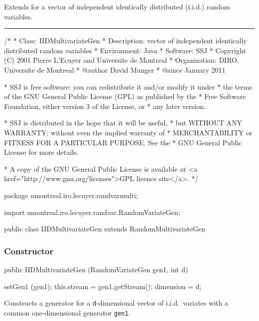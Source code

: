 
Extends  for a vector of independent identically distributed
(i.i.d.) random variables.


\bigskip\hrule

\begin{code}
\begin{hide}
/*
 * Class:        IIDMultivariateGen
 * Description:  vector of independent identically distributed random variables
 * Environment:  Java
 * Software:     SSJ 
 * Copyright (C) 2001  Pierre L'Ecuyer and Universite de Montreal
 * Organization: DIRO, Universite de Montreal
 * @author       David Munger
 * @since        January 2011

 * SSJ is free software: you can redistribute it and/or modify it under
 * the terms of the GNU General Public License (GPL) as published by the
 * Free Software Foundation, either version 3 of the License, or
 * any later version.

 * SSJ is distributed in the hope that it will be useful,
 * but WITHOUT ANY WARRANTY; without even the implied warranty of
 * MERCHANTABILITY or FITNESS FOR A PARTICULAR PURPOSE.  See the
 * GNU General Public License for more details.

 * A copy of the GNU General Public License is available at
   <a href="http://www.gnu.org/licenses">GPL licence site</a>.
 */
\end{hide}
package umontreal.iro.lecuyer.randvarmulti;
\begin{hide}
import umontreal.iro.lecuyer.randvar.RandomVariateGen;
\end{hide}

public class IIDMultivariateGen extends RandomMultivariateGen\begin{hide} {
\end{hide}\end{code}

\subsubsection*{Constructor}

\begin{code}

   public IIDMultivariateGen (RandomVariateGen gen1, int d) \begin{hide} {
      setGen1 (gen1);
      this.stream = gen1.getStream();
      dimension = d;
   } \end{hide}
\end{code}
\begin{tabb}
Constructs a generator for a \texttt{d}-dimensional vector of i.i.d.\ variates
with a common one-dimensional generator \texttt{gen1}.
\end{tabb}
\begin{htmlonly}
\end{htmlonly}


